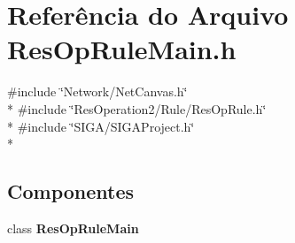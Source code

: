 \section{Referência do Arquivo Res\+Op\+Rule\+Main.\+h}
\label{_2_rule_2_res_op_rule_main_8h}
{\ttfamily \#include \char`\"{}Network/\+Net\+Canvas.\+h\char`\"{}}\\*
{\ttfamily \#include \char`\"{}Res\+Operation2/\+Rule/\+Res\+Op\+Rule.\+h\char`\"{}}\\*
{\ttfamily \#include \char`\"{}S\+I\+G\+A/\+S\+I\+G\+A\+Project.\+h\char`\"{}}\\*
\subsection*{Componentes}
\begin{DoxyCompactItemize}
\item 
class {\bf Res\+Op\+Rule\+Main}
\end{DoxyCompactItemize}
